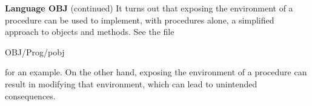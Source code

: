 \begin{minipage}[t]{\sw}
\slidenumber
\LARGE
{\bf Language OBJ} (continued)\exx
It turns out that exposing the environment of a procedure
can be used to implement, with procedures alone,
a simplified approach to objects and methods.
See the file
\begin{qv}
OBJ/Prog/pobj
\end{qv}
for an example.
On the other hand, exposing the environment of a procedure
can result in modifying that environment,
which can lead to unintended consequences.
\end{minipage}
